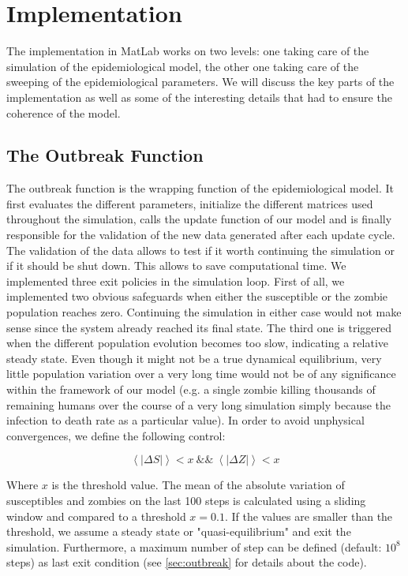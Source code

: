 \documentclass[11pt]{article} %
\begin{document}
\newpage
\section{Implementation}\indent

The implementation in MatLab works on two levels: one taking care of the simulation of the epidemiological model, the other one taking care of the sweeping of the epidemiological parameters. We will discuss the key parts of the implementation as well as some of the interesting details that had to ensure the coherence of the model.


\subsection{The Outbreak Function}\indent

The outbreak function is the wrapping function of the epidemiological model. It first evaluates the different parameters, initialize the different matrices used throughout the simulation, calls the update function of our model and is finally responsible for the validation of the new data generated after each update cycle. The validation of the data allows to test if it worth continuing the simulation or if it should be shut down. This allows to save computational time. We implemented three exit policies in the simulation loop. First of all, we implemented two obvious safeguards when either the susceptible or the zombie population reaches zero. Continuing the simulation in either case would not make sense since the system already reached its final state. The third one is triggered when the different population evolution becomes too slow, indicating a relative steady state. Even though it might not be a true dynamical equilibrium, very little population variation over a very long time would not be of any significance within the framework of our model (e.g. a single zombie killing thousands of remaining humans over the course of a very long simulation simply because the infection to death rate as a particular value). In order to avoid unphysical convergences, we define the following control:

\begin{equation} \label{eq:outbreakequilibrium}
\left\langle \left| \Delta S \right| \right\rangle < x\ \&\&\ \left\langle\left|\Delta Z \right| \right\rangle < x
\end{equation}

Where $x$ is the threshold value. The mean of the absolute variation of susceptibles and zombies on the last 100 steps is calculated using a sliding window and compared to a threshold $x = 0.1$. If the values are smaller than the threshold, we assume a steady state or "quasi-equilibrium" and exit the simulation. Furthermore, a maximum number of step can be defined (default: $10^8$ steps) as last exit condition (see \ref{sec:outbreak} for details about the code).
\end{document}
